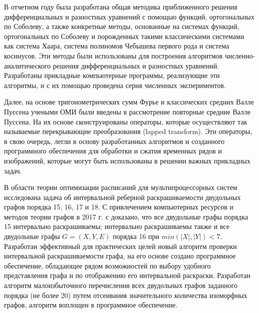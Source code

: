 В отчетном году была разработана общая методика приближенного решения дифференциальных и разностных уравнений с помощью функций, ортогональных по Соболеву, а также конкретные методы, основанные на системах функций, ортогональных по Соболеву и порожденных такими классическими системами как система Хаара, система полиномов Чебышева первого рода и система косинусов. Эти методы были использованы для построения алгоритмов численно-аналитического решения дифференциальных и разностных уравнений. Разработаны прикладные компьютерные программы, реализующие эти алгоритмы, и с их помощью проведена серия численных экспериментов.




Далее, на основе тригонометрических сумм Фурье и классических средних Валле Пуссена учеными ОМИ были введены в рассмотрение повторные средние Валле Пуссена. На их основе сконструированы операторы, которые осуществляют так называемые перекрывающие преобразования (lapped transform). Эти операторы, в свою очередь, легли в основу разработанных алгоритмов и созданного программного обеспечения для обработки и сжатия временных рядов и изображений, которые могут быть использованы в решении важных прикладных задач.








В области теории оптимизации расписаний для мультипроцессорных систем исследована задача об интервальной реберной раскрашиваемости двудольных графов порядка 15, 16, 17 и 18. С привлечением компьютерных ресурсов и методов теории графов в 2017 г. с доказано, что все двудольные графы порядка 15 интервально раскрашиваемы; интервально раскрашиваемы также и все двудольные графы $G=(X,Y,E)$ порядка 16 при $min(|X|, |Y|)<7$. Разработан эффективный для практических целей новый алгоритм проверки интервальной раскрашиваемости графа, на его основе
создано программное обеспечение, обладающее рядом возможностей по выбору удобного представления графа и по отображению
его интервальной раскраски.  Разработан алгоритм малоизбыточного перечисления всех
двудольных графов заданного порядка (не более 20) путем отсеивания значительного количества изоморфных графов, алгоритм
воплощен в программное обеспечение.






